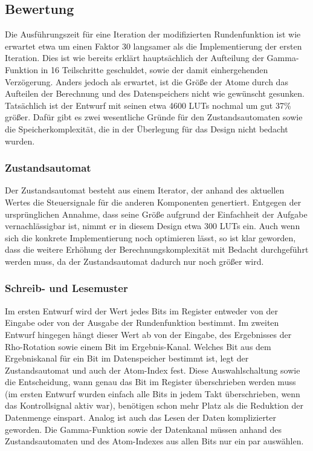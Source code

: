 \subsection{Bewertung}
Die Ausführungszeit für eine Iteration der modifizierten Rundenfunktion ist wie erwartet etwa um einen Faktor 30 langsamer als die Implementierung der ersten Iteration.
Dies ist wie bereits erklärt hauptsächlich der Aufteilung der Gamma-Funktion in 16 Teilschritte geschuldet, sowie der damit einhergehenden Verzögerung.
Anders jedoch als erwartet, ist die Größe der Atome durch das Aufteilen der Berechnung und des Datenspeichers nicht wie gewünscht gesunken.
Tatsächlich ist der Entwurf mit seinen etwa 4600 LUTs nochmal um gut 37\% größer. Dafür gibt es zwei wesentliche Gründe für den Zustandsautomaten sowie die Speicherkomplexität,
die in der Überlegung für das Design nicht bedacht wurden.
\subsubsection{Zustandsautomat}
Der Zustandsautomat besteht aus einem Iterator, der anhand des aktuellen Wertes die Steuersignale für die anderen Komponenten genertiert.
Entgegen der ursprünglichen Annahme, dass seine Größe aufgrund der Einfachheit der Aufgabe vernachlässigbar ist, nimmt er in diesem Design etwa 300 LUTs ein.
Auch wenn sich die konkrete Implementierung noch optimieren lässt, so ist klar geworden, dass die weitere Erhöhung der Berechnungskomplexität mit Bedacht durchgeführt werden muss,
da der Zustandsautomat dadurch nur noch größer wird.
\subsubsection{Schreib- und Lesemuster}
Im ersten Entwurf wird der Wert jedes Bits im Register entweder von der Eingabe oder von der Ausgabe der Rundenfunktion bestimmt.
Im zweiten Entwurf hingegen hängt dieser Wert ab von der Eingabe, des Ergebnisses der Rho-Rotation sowie einem Bit im Ergebnis-Kanal.
Welches Bit aus dem Ergebniskanal für ein Bit im Datenspeicher bestimmt ist, legt der Zustandsautomat und auch der Atom-Index fest.
Diese Auswahlschaltung sowie die Entscheidung, wann genau das Bit im Register überschrieben werden muss (im ersten Entwurf wurden einfach alle Bits in jedem Takt überschrieben, wenn das Kontrollsignal aktiv war),
benötigen schon mehr Platz als die Reduktion der Datenmenge einspart.
Analog ist auch das Lesen der Daten komplizierter geworden. Die Gamma-Funktion sowie der Datenkanal müssen anhand des Zustandsautomaten und des Atom-Indexes aus allen Bits nur ein par auswählen.
